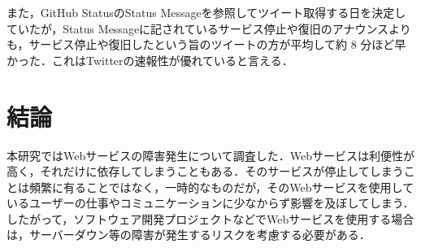 \documentclass[uplatex,twocolumn]{jsarticle}
\begin{document}
また，GitHub StatusのStatus Messageを参照してツイート取得する日を決定していたが，Status Messageに記されているサービス停止や復旧のアナウンスよりも，サービス停止や復旧したという旨のツイートの方が平均して約 8 分ほど早かった．これはTwitterの速報性が優れていると言える．

\section{結論}
本研究ではWebサービスの障害発生について調査した．Webサービスは利便性が高く，それだけに依存してしまうこともある．そのサービスが停止してしまうことは頻繁に有ることではなく，一時的なものだが，そのWebサービスを使用しているユーザーの仕事やコミュニケーションに少なからず影響を及ぼしてしまう．したがって，ソフトウェア開発プロジェクトなどでWebサービスを使用する場合は，サーバーダウン等の障害が発生するリスクを考慮する必要がある．


\end{document}

